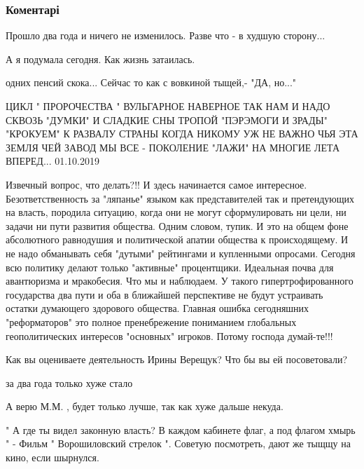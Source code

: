  
 
 
 
 
\subsubsection{Коментарі}

\begin{itemize} %
Прошло два года и ничего не изменилось. Разве что - в худшую сторону...

А я подумала сегодня. Как жизнь затаилась.

одних пенсий скока... Сейчас то как с вовкиной тыщей,- "ДА, но..."


\obeycr
ЦИКЛ " ПРОРОЧЕСТВА "
ВУЛЬГАРНОЕ
НАВЕРНОЕ ТАК НАМ И НАДО
СКВОЗЬ "ДУМКИ" И СЛАДКИЕ СНЫ
ТРОПОЙ "ПЭРЭМОГИ И ЗРАДЫ"
"КРОКУЕМ" К РАЗВАЛУ СТРАНЫ
КОГДА НИКОМУ УЖ НЕ ВАЖНО
ЧЬЯ ЭТА ЗЕМЛЯ ЧЕЙ ЗАВОД
МЫ ВСЕ - ПОКОЛЕНИЕ "ЛАЖИ"
НА МНОГИЕ ЛЕТА ВПЕРЕД...
01.10.2019
\restorecr


Извечный вопрос, что делать?!! И здесь начинается самое интересное.
Безответственность за "ляпанье" языком как представителей так и претендующих на
власть, породила ситуацию, когда они не могут сформулировать ни цели, ни задачи
ни пути развития общества. Одним словом, тупик. И это на общем фоне абсолютного
равнодушия и политической апатии общества к происходящему. И не надо обманывать
себя "дутыми" рейтингами и купленными опросами. Сегодня всю политику делают
только "активные" процентщики. Идеальная почва для авантюризма и мракобесия.
Что мы и наблюдаем. У такого гипертрофированного государства два пути и оба в
ближайшей перспективе не будут устраивать остатки думающего здорового общества.
Главная ошибка сегодняшних "реформаторов" это полное пренебрежение пониманием
глобальных геополитических интересов "основных" игроков. Потому господа
думай-те!!!


Как вы оцениваете деятельность Ирины Верещук? Что бы вы ей посоветовали?

за два года только хуже стало

А верю М.М. , будет только лучше, так как хуже дальше некуда.


" А где ты видел законную власть? В каждом кабинете флаг, а под флагом хмырь "
- Фильм " Ворошиловский стрелок ". Советую посмотреть, дают же тыщщу на кино,
если шырнулся.

\end{itemize} %
